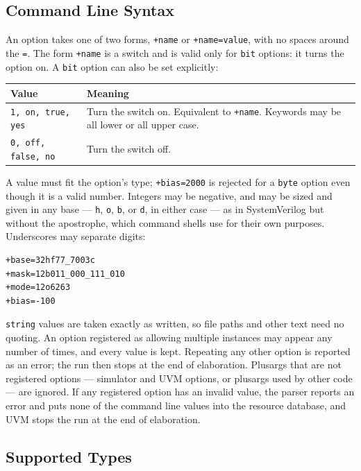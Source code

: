 \documentclass[11pt,letterpaper]{report}
\begin{document}
\subsection*{Command Line Syntax}

An option takes one of two forms, \texttt{+name} or \texttt{+name=value}, with no spaces around the \texttt{=}. The form \texttt{+name} is a switch and is valid only for \texttt{bit} options: it turns the option on. A \texttt{bit} option can also be set explicitly:

\begin{xltabular}{\linewidth}{>{\small}p{2.0in} >{\small}X}
\toprule
\textbf{Value} & \textbf{Meaning} \\
\midrule
\endhead
\bottomrule
\endfoot
\texttt{1, on, true, yes} & Turn the switch on. Equivalent to \texttt{+name}. Keywords may be all lower or all upper case. \\
\texttt{0, off, false, no} & Turn the switch off. \\
\end{xltabular}

A value must fit the option's type; \texttt{+bias=2000} is rejected for a \texttt{byte} option even though it is a valid number. Integers may be negative, and may be sized and given in any base --- \texttt{h}, \texttt{o}, \texttt{b}, or \texttt{d}, in either case --- as in SystemVerilog but without the apostrophe, which command shells use for their own purposes. Underscores may separate digits:

\begin{verbatim}
+base=32hf77_7003c
+mask=12b011_000_111_010
+mode=12o6263
+bias=-100
\end{verbatim}

\texttt{string} values are taken exactly as written, so file paths and other text need no quoting. An option registered as allowing multiple instances may appear any number of times, and every value is kept. Repeating any other option is reported as an error; the run then stops at the end of elaboration. Plusargs that are not registered options --- simulator and UVM options, or plusargs used by other code --- are ignored. If any registered option has an invalid value, the parser reports an error and puts none of the command line values into the resource database, and UVM stops the run at the end of elaboration.

\subsection*{Supported Types}
\end{document}
